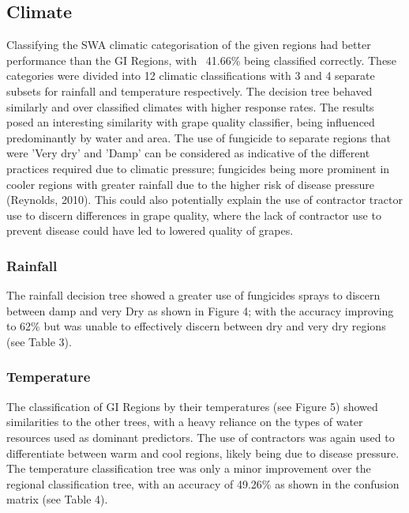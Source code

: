 \documentclass[review,12pt,authoryear]{elsarticle}
\begin{document}
\begin{linenumbers}
\subsection{Climate}
Classifying the SWA climatic categorisation of the given regions had better performance than the GI Regions, with ~41.66\% being classified correctly. These categories were divided into 12 climatic classifications with 3 and 4 separate subsets for rainfall and temperature respectively. The decision tree behaved similarly and over classified climates with higher response rates. The results posed an interesting similarity with grape quality classifier, being influenced predominantly by water and area. The use of fungicide to separate regions that were 'Very dry' and 'Damp' can be considered as indicative of the different practices required due to climatic pressure; fungicides being more prominent in cooler regions with greater rainfall due to the higher risk of disease pressure (Reynolds, 2010). This could also potentially explain the use of contractor tractor use to discern differences in grape quality, where the lack of contractor use to prevent disease could have led to lowered quality of grapes.

\subsubsection{Rainfall}
The rainfall decision tree showed a greater use of fungicides sprays to discern between damp and very Dry as shown in Figure 4; with the accuracy improving to 62\% but was unable to effectively discern between dry and very dry regions (see Table 3).

\subsubsection{Temperature}
The classification of GI Regions by their temperatures (see Figure 5) showed similarities to the other trees, with a heavy reliance on the types of water resources used as dominant predictors. The use of contractors was again used to differentiate between warm and cool regions, likely being due to disease pressure. The temperature classification tree was only a minor improvement over the regional classification tree, with an accuracy of 49.26\% as shown in the confusion matrix (see Table 4).


\end{linenumbers}
\end{document}
